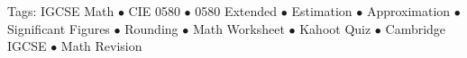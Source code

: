 \documentclass[11pt,a4paper]{article}
\begin{document}
\vspace{14pt}
\begin{center}
  \sffamily\scriptsize\textcolor{textmuted}{
    Tags: IGCSE Math $\bullet$ CIE 0580 $\bullet$ 0580 Extended $\bullet$ Estimation $\bullet$ Approximation $\bullet$ Significant Figures $\bullet$ Rounding $\bullet$ Math Worksheet $\bullet$ Kahoot Quiz $\bullet$ Cambridge IGCSE $\bullet$ Math Revision
  }
\end{center}
\end{document}
